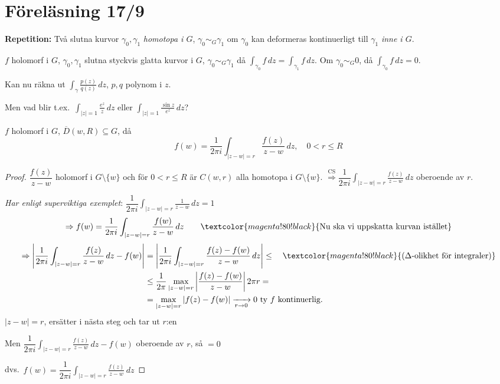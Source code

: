 \section{Föreläsning 17/9}

\textbf{Repetition:} Två slutna kurvor $\gamma_0, \gamma_1$ \emph{homotopa i $G$}, $\gamma_0 \sim_G \gamma_1$ om $\gamma_0$ kan deformeras kontinuerligt till $\gamma_1$ \emph{inne i $G$}.

\begin{theorem}
$f$ holomorf i $G$, $\gamma_0, \gamma_1$ slutna styckvis glatta kurvor i $G$, $\gamma_0 \sim_G \gamma_1$ då $\displaystyle\int_{\gamma_0} f\,dz = \int_{\gamma_1} f\,dz$. Om $\gamma_0 \sim_G 0$, då $\displaystyle\int_{\gamma_0} f\,dz = 0$.
\end{theorem}

Kan nu räkna ut $\displaystyle\int_\gamma \frac{p(z)}{q(z)}\,dz$, $p, q$ polynom i $z$.

\textcolor{red!70!black}{Men} vad blir t.ex.\ $\displaystyle\int_{|z| = 1} \frac{e^z}{z}\,dz$ eller $\displaystyle\int_{|z| = 1} \frac{\sin z}{e^z}\,dz$?

\begin{theorem}
$f$ holomorf i $G$, $\overline{D}(w, R) \subseteq G$, då
\[ f(w) = \frac{1}{2\pi i} \int_{|z - w| = r} \frac{f(z)}{z - w}\,dz, \quad 0 < r \le R \]
\end{theorem}
\begin{proof}
$\dfrac{f(z)}{z - w}$ holomorf i $G \setminus \{w\}$ och för $0 < r \le R$ är $C(w, r)$ alla homotopa i $G \setminus \{w\}$. $\overset{\text{CS}}{\Longrightarrow} \dfrac{1}{2\pi i} \displaystyle\int_{|z - w| = r} \frac{f(z)}{z - w}\,dz$ oberoende av $r$.

\emph{Har enligt superviktiga exemplet}: $\dfrac{1}{2\pi i} \displaystyle\int_{|z - w| = r} \frac{1}{z - w}\,dz = 1$
\[ \Rightarrow f(w) = \frac{1}{2\pi i} \int_{|z - w| = r} \frac{f(w)}{z - w}\,dz \qquad \textcolor{magenta!80!black}{\text{Nu ska vi uppskatta kurvan istället}} \]
\begin{align*}
  \Rightarrow \left| \frac{1}{2\pi i} \int_{|z - w| = r} \frac{f(z)}{z - w}\,dz - f(w) \right| &= \left| \frac{1}{2\pi i} \int_{|z - w| = r} \frac{f(z) - f(w)}{z - w}\,dz \right| \le \quad \textcolor{magenta!80!black}{(\Delta\text{-olikhet för integraler})} \\
  &\le \frac{1}{2\pi} \max_{|z - w| = r} \left| \frac{f(z) - f(w)}{z - w} \right| 2\pi r = \\
  &= \max_{|z - w| = r} |f(z) - f(w)| \xrightarrow[r \to 0]{} 0 \text{ ty } f \text{ kontinuerlig.}
\end{align*}
\textcolor{magenta!80!black}{$|z - w| = r$, ersätter i nästa steg och tar ut $r$:en}

\textcolor{red!70!black}{Men} $\dfrac{1}{2\pi i} \displaystyle\int_{|z - w| = r} \frac{f(z)}{z - w}\,dz - f(w)$ oberoende av $r$, så $= 0$

dvs.\ $f(w) = \dfrac{1}{2\pi i} \displaystyle\int_{|z - w| = r} \frac{f(z)}{z - w}\,dz$
\end{proof}
